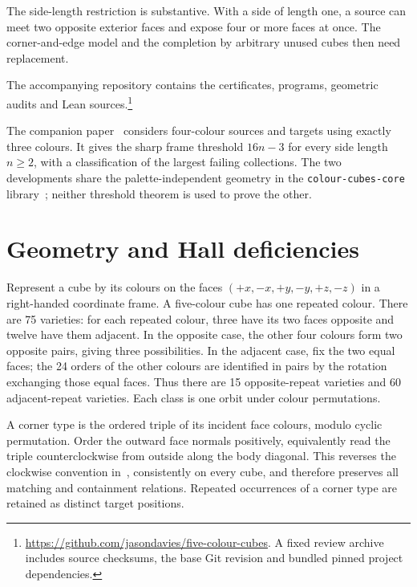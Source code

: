 \documentclass[11pt]{article}
\theoremstyle{remark}
\begin{document}
The side-length restriction is substantive. With a side of length one,
a source can meet two opposite exterior faces and expose four or more
faces at once. The corner-and-edge model and the completion by arbitrary
unused cubes then need replacement.

The accompanying repository contains the certificates, programs,
geometric audits and Lean sources.\footnote{\url{https://github.com/jasondavies/five-colour-cubes}.
A fixed review archive includes source checksums, the base Git revision and
bundled pinned project dependencies.}

The companion paper~\cite{FourToThree} considers four-colour sources and
targets using exactly three colours. It gives the sharp frame threshold
$16n-3$ for every side length $n\ge2$, with a classification of the largest
failing collections. The two developments share the palette-independent
geometry in the \texttt{colour-\allowbreak cubes-\allowbreak core} library~\cite{ColourCubes};
neither threshold theorem is used to prove the other.

\section{Geometry and Hall deficiencies}\label{sec:model}
Represent a cube by its colours on the faces
$(+x,-x,+y,-y,+z,-z)$ in a right-handed coordinate frame. A five-colour cube
has one repeated colour. There are 75 varieties: for each repeated colour,
three have its two faces opposite and twelve have them adjacent. In the
opposite case, the other four colours form two opposite pairs, giving three
possibilities. In the adjacent case, fix the two equal faces; the 24 orders
of the other colours are identified in pairs by the rotation exchanging
those equal faces. Thus there are 15 opposite-repeat varieties and 60
adjacent-repeat varieties. Each class is one orbit under colour permutations.

A corner type is the ordered triple of its incident face colours, modulo
cyclic permutation. Order the outward face normals positively, equivalently
read the triple counterclockwise from outside along the body diagonal.
This reverses the clockwise convention in~\cite{BES}, consistently on every
cube, and therefore preserves all matching and containment relations.
Repeated occurrences of a corner type are retained as distinct target
positions.
\end{document}
